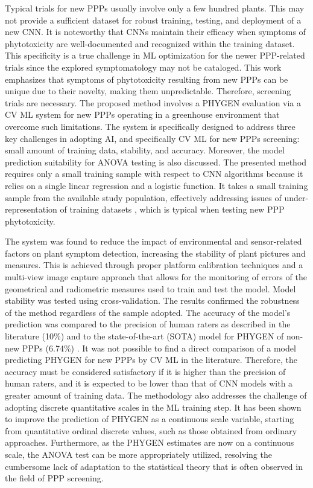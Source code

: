 \documentclass[12pt,a4paper,oneside]{report}
\begin{document}
Typical trials for new PPPs usually involve only a few hundred plants. This may not provide a sufficient dataset for robust training, testing, and deployment of a new CNN. It is noteworthy that CNNs maintain their efficacy when symptoms of phytotoxicity are well-documented and recognized within the training dataset. This specificity is a true challenge in ML optimization for the newer PPP-related trials since the explored symptomatology may not be cataloged.
This work emphasizes that symptoms of phytotoxicity resulting from new PPPs can be unique due to their novelty, making them unpredictable. Therefore, screening trials are necessary. The proposed method involves a PHYGEN evaluation via a CV ML system for new PPPs operating in a greenhouse environment that overcome such limitations.
The system is specifically designed to address three key challenges in adopting AI, and specifically CV ML for new PPPs screening: small amount of training data, stability, and accuracy. Moreover, the model prediction suitability for ANOVA testing is also discussed.
The presented method requires only a small training sample with respect to CNN algorithms because it relies on a single linear regression and a logistic function. It takes a small training sample from the available study population, effectively addressing issues of under-representation of training datasets 
\cite{barbedoDeepLearningApplied2022},
which is typical when testing new PPP phytotoxicity.

The system was found to reduce the impact of environmental and sensor-related factors on plant symptom detection, increasing the stability of plant pictures and measures. This is achieved through proper platform calibration techniques and a multi-view image capture approach that allows for the monitoring of errors of the geometrical and radiometric measures used to train and test the model. Model stability was tested using cross-validation. The results confirmed the robustness of the method regardless of the sample adopted. The accuracy of the model’s prediction was compared to the precision of human raters as described in the literature (10\%) 
\cite{chiangEffectsRaterBias2016} 
and to the state-of-the-art (SOTA) model for PHYGEN of non-new PPPs (6.74\%)
\cite{gomez-zamanilloDamageAssessmentSoybean2023}. 
It was not possible to find a direct comparison of a model predicting PHYGEN for new PPPs by CV ML in the literature. Therefore, the accuracy must be considered satisfactory if it is higher than the precision of human raters, and it is expected to be lower than that of CNN models with a greater amount of training data. The methodology also addresses the challenge of adopting discrete quantitative scales in the ML training step. It has been shown to improve the prediction of PHYGEN as a continuous scale variable, starting from quantitative ordinal discrete values, such as those obtained from ordinary approaches. Furthermore, as the PHYGEN estimates are now on a continuous scale, the ANOVA test can be more appropriately utilized, resolving the cumbersome lack of adaptation to the statistical theory that is often observed in the field of PPP screening.
\end{document}
